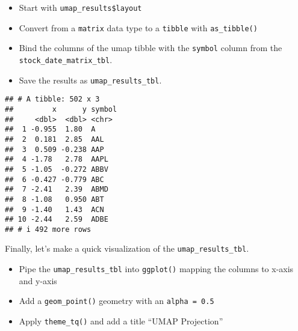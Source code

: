 \documentclass[
]{article}
\newenvironment{Shaded}{\begin{snugshade}}{\end{snugshade}}
\newcommand{\AttributeTok}[1]{\textcolor[rgb]{0.13,0.29,0.53}{#1}}
\newcommand{\CommentTok}[1]{\textcolor[rgb]{0.56,0.35,0.01}{\textit{#1}}}
\newcommand{\FunctionTok}[1]{\textcolor[rgb]{0.13,0.29,0.53}{\textbf{#1}}}
\newcommand{\NormalTok}[1]{#1}
\newcommand{\OtherTok}[1]{\textcolor[rgb]{0.56,0.35,0.01}{#1}}
\newcommand{\SpecialCharTok}[1]{\textcolor[rgb]{0.81,0.36,0.00}{\textbf{#1}}}
\newcommand{\StringTok}[1]{\textcolor[rgb]{0.31,0.60,0.02}{#1}}
\providecommand{\tightlist}{%
  \setlength{\itemsep}{0pt}\setlength{\parskip}{0pt}}
\begin{document}
\begin{itemize}
\tightlist
\item
  Start with \texttt{umap\_results\$layout}
\item
  Convert from a \texttt{matrix} data type to a \texttt{tibble} with
  \texttt{as\_tibble()}
\item
  Bind the columns of the umap tibble with the \texttt{symbol} column
  from the \texttt{stock\_date\_matrix\_tbl}.
\item
  Save the results as \texttt{umap\_results\_tbl}.
\end{itemize}

\begin{Shaded}
\end{Shaded}

\begin{verbatim}
## # A tibble: 502 x 3
##         x      y symbol
##     <dbl>  <dbl> <chr> 
##  1 -0.955  1.80  A     
##  2  0.181  2.85  AAL   
##  3  0.509 -0.238 AAP   
##  4 -1.78   2.78  AAPL  
##  5 -1.05  -0.272 ABBV  
##  6 -0.427 -0.779 ABC   
##  7 -2.41   2.39  ABMD  
##  8 -1.08   0.950 ABT   
##  9 -1.40   1.43  ACN   
## 10 -2.44   2.59  ADBE  
## # i 492 more rows
\end{verbatim}

Finally, let's make a quick visualization of the
\texttt{umap\_results\_tbl}.

\begin{itemize}
\tightlist
\item
  Pipe the \texttt{umap\_results\_tbl} into \texttt{ggplot()} mapping
  the columns to x-axis and y-axis
\item
  Add a \texttt{geom\_point()} geometry with an \texttt{alpha\ =\ 0.5}
\item
  Apply \texttt{theme\_tq()} and add a title ``UMAP Projection''
\end{itemize}
\end{document}
